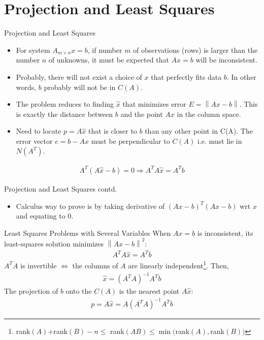 \documentclass{beamer}
\begin{document}


\section{Projection and Least Squares}

\begin{frame}{Projection and Least Squares}
\begin{itemize}
    \item For system $A_{m\times n}x = b$, if number $m$ of observations (rows) is larger than the number $n$ of unknowns, it must be expected that $Ax=b$ will be inconsistent.
    \item Probably, there will not exist a choice of $x$ that perfectly fits  data $b$. In other words, $b$ probably will not be in $C(A)$.
    \item The problem reduces to finding $\hat{x}$ that minimizes error $E = \left\|Ax-b\right\|$. This is exactly the distance between $b$ and the point $Ax$ in the column space.
    \item Need to locate $p = A\hat{x}$ that is closer to $b$ than any other point in C(A). The error vector $e = b - A\hat{x}$ must be perpendicular to $C(A)$ i.e. must lie in $N(A^T)$.
\end{itemize}
\begin{align*}
    A^T(A\hat{x}-b) = 0 \Rightarrow A^TA\hat{x} = A^Tb
\end{align*}
\end{frame}

\begin{frame}{Projection and Least Squares contd.}
\begin{itemize}
    \item Calculus way to prove is by taking derivative of $(Ax-b)^T(Ax-b)$ wrt $x$ and equating to $0$.
\end{itemize}
\begin{exampleblock}{Least Squares Problems with Several Variables}
When $Ax=b$ is inconsistent, its least-squares solution minimizes $\left\|Ax-b\right\|^2$:
\begin{align*}
    A^TA\hat{x} = A^Tb
\end{align*}
$A^TA$ is invertible $\iff$ the columns of $A$ are linearly independent\footnote{rank$(A)$+rank$(B)-n \leq $ rank$(AB) \leq \min($rank$(A),$rank$(B))$}. Then,
\begin{align*}
    \hat{x} = (A^TA)^{-1}A^Tb
\end{align*}
The projection of $b$ onto the $C(A)$ is the nearest point $A\hat{x}$:
\begin{align*}
    p = A\hat{x} = A(A^TA)^{-1}A^Tb
\end{align*}
\end{exampleblock}
\end{frame}
\end{document}
